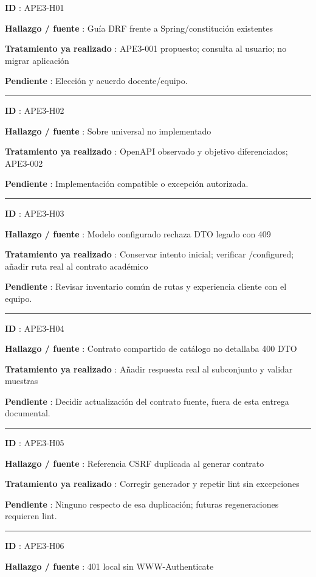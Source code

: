 \documentclass[11pt,a4paper]{article}
\begin{document}
\textbf{ID }: APE3-H01

\textbf{Hallazgo / fuente }: Guía DRF frente a Spring/constitución
existentes

\textbf{Tratamiento ya realizado }: APE3-001 propuesto; consulta al
usuario; no migrar aplicación

\textbf{Pendiente }: Elección y acuerdo docente/equipo.

\medskip\hrule\medskip

\textbf{ID }: APE3-H02

\textbf{Hallazgo / fuente }: Sobre universal no implementado

\textbf{Tratamiento ya realizado }: OpenAPI observado y objetivo
diferenciados; APE3-002

\textbf{Pendiente }: Implementación compatible o excepción autorizada.

\medskip\hrule\medskip

\textbf{ID }: APE3-H03

\textbf{Hallazgo / fuente }: Modelo configurado rechaza DTO legado con
409

\textbf{Tratamiento ya realizado }: Conservar intento inicial; verificar
/configured; añadir ruta real al contrato académico

\textbf{Pendiente }: Revisar inventario común de rutas y experiencia
cliente con el equipo.

\medskip\hrule\medskip

\textbf{ID }: APE3-H04

\textbf{Hallazgo / fuente }: Contrato compartido de catálogo no
detallaba 400 DTO

\textbf{Tratamiento ya realizado }: Añadir respuesta real al subconjunto
y validar muestras

\textbf{Pendiente }: Decidir actualización del contrato fuente, fuera de
esta entrega documental.

\medskip\hrule\medskip

\textbf{ID }: APE3-H05

\textbf{Hallazgo / fuente }: Referencia CSRF duplicada al generar
contrato

\textbf{Tratamiento ya realizado }: Corregir generador y repetir lint
sin excepciones

\textbf{Pendiente }: Ninguno respecto de esa duplicación; futuras
regeneraciones requieren lint.

\medskip\hrule\medskip

\textbf{ID }: APE3-H06

\textbf{Hallazgo / fuente }: 401 local sin WWW-Authenticate
\end{document}
